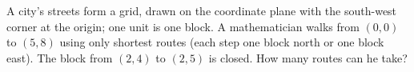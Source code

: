A city's streets form a grid, drawn on the coordinate plane with the south-west corner at the origin; one unit is one block. A mathematician walks from $(0,0)$ to $(5,8)$ using only shortest routes (each step one block north or one block east). The block from $(2,4)$ to $(2,5)$ is closed. How many routes can he take?
